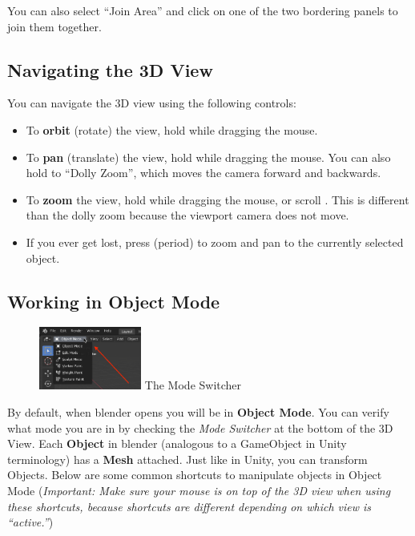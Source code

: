 \documentclass[11pt]{article}
\begin{document}
\noindent You can also select ``Join Area'' and click on one of the two bordering panels to join
them together.

\subsection{Navigating the 3D View}

You can navigate the 3D view using the following controls:
\begin{itemize}
    \item To \textbf{orbit} (rotate) the view, hold  while dragging the
    mouse.
    \item To \textbf{pan} (translate) the view, hold  while dragging
    the mouse.  You can also hold  to ``Dolly Zoom'', which
    moves the camera forward and backwards.
    \item To \textbf{zoom} the view, hold  while dragging the mouse,
    or scroll .  This is different than the dolly zoom because the viewport camera
    does not move.
    \item If you ever get lost, press  (period) to zoom and pan to the 
    currently selected object.
\end{itemize}

\subsection{Working in Object Mode}

\begin{figure}
    \centering \vspace*{-3.5em}
    \includegraphics[width=0.3\textwidth]{mode-switcher}
    The Mode Switcher
\end{figure}
By default, when blender opens you will be in \textbf{Object Mode}.  You can verify what mode you 
are in by checking the \textit{Mode Switcher} at the bottom of the 3D View.  Each \textbf{Object} in blender
(analogous to a GameObject in Unity terminology) has a \textbf{Mesh} attached.  Just like in Unity,
you can transform Objects.  Below are some common shortcuts to manipulate objects in Object Mode 
(\textit{Important: Make sure your mouse is on top of the 3D view when using these shortcuts, because
shortcuts are different depending on which view is ``active.''})
\end{document}
